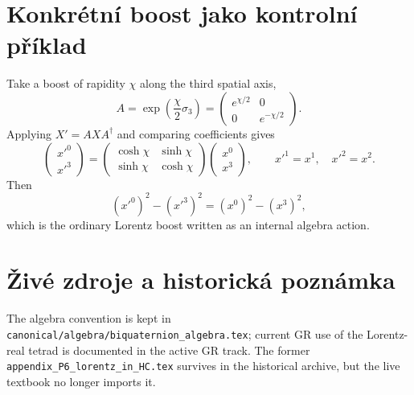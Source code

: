 \section{Konkrétní boost jako kontrolní příklad}
Take a boost of rapidity $\chi$ along the third spatial axis,
\[
 A=\exp\left(\frac{\chi}{2}\sigma_3\right)
 =\begin{pmatrix}e^{\chi/2}&0\\0&e^{-\chi/2}\end{pmatrix}.
\]
Applying $X'=AXA^\dagger$ and comparing coefficients gives
\[
 \begin{pmatrix}x'^0\\x'^3\end{pmatrix}
 =\begin{pmatrix}\cosh\chi&\sinh\chi\\
                  \sinh\chi&\cosh\chi\end{pmatrix}
  \begin{pmatrix}x^0\\x^3\end{pmatrix},
 \qquad x'^1=x^1,\quad x'^2=x^2.
\]
Then
\[
 (x'^0)^2-(x'^3)^2=(x^0)^2-(x^3)^2,
\]
which is the ordinary Lorentz boost written as an internal algebra action.

\section{Živé zdroje a historická poznámka}
The algebra convention is kept in
\texttt{canonical/algebra/biquaternion\_algebra.tex}; current GR use of the
Lorentz-real tetrad is documented in the active GR track.  The former
\texttt{appendix\_P6\_lorentz\_in\_HC.tex} survives in the historical archive,
but the live textbook no longer imports it.
